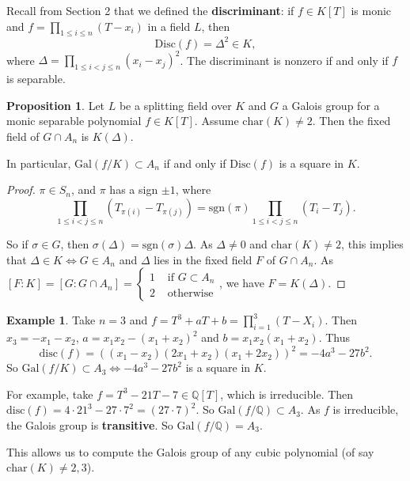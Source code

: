 \documentclass{article}
\theoremstyle{definition}
\newtheorem{prop}[theorem]{Proposition}
\newtheorem{example}{Example}[section]
\begin{document}
Recall from Section 2 that we defined the \textbf{discriminant}: if $f \in K[T]$ is monic and $f = \prod_{1\le i \le n}^{} (T-x_i)$ in a field $L$, then
\[
\text{Disc}(f) = \Delta^2 \in K,
\]
where $\Delta = \prod_{1\le i < j \le n}^{} (x_i-x_j)^2$. The discriminant is nonzero if and only if $f$ is separable.
\begin{prop}
    Let $L$ be a splitting field over $K$ and $G$ a Galois group for a monic separable polynomial $f \in K[T]$. Assume $\text{char}(K)\neq 2$. Then the fixed field of $G \cap A_n$ is $K(\Delta)$.
    \vspace{1mm}
    
    In particular, $\text{Gal}(f/K) \subset A_n$ if and only if $\text{Disc}(f)$ is a square in $K$.
\end{prop}

\begin{proof}
    
    $\pi \in S_n$, and $\pi$ has a sign $\pm 1$, where $$\prod_{1\le i<j\le n}^{} (T_{\pi(i)}-T_{\pi(j)})=\text{sgn}(\pi)\prod_{1\le i<j\le n}^{} (T_i-T_j).$$

    So if $\sigma \in G$, then $\sigma(\Delta) = \text{sgn}(\sigma)\Delta$. As $\Delta \neq 0$ and $\text{char}(K)\neq 2$, this implies that $\Delta \in K \iff G \in A_n$ and $\Delta$ lies in the fixed field $F$ of $G \cap A_n$. As $[F: K] = [G : G \cap A_n] = \begin{cases}
        1 &\text{ if } G \subset A_n \\
        2 &\text{ otherwise}
    \end{cases}$, we have $F = K(\Delta)$.
\end{proof}
\begin{example}
    Take $n=3$ and $f = T^3+aT+b = \prod_{i=1}^{3} (T-X_i)$. Then $x_3 = -x_1-x_2$, $a = x_1x_2 - (x_1+x_2)^2$ and $b=x_1x_2(x_1+x_2)$. Thus \[
    \text{disc}(f) = ((x_1-x_2)(2x_1+x_2)(x_1+2x_2))^2 = -4a^3 - 27b^2.
    \] 
    So $\text{Gal}(f/K) \subset A_3 \iff -4a^3-27b^2$ is a square in $K$.
    \vspace{1mm}
    
    For example, take $f = T^3-21T - 7 \in \mathbb{Q}[T]$, which is irreducible. Then $\text{disc}(f)=4 \cdot 21^3 - 27 \cdot  7 ^2 = (27\cdot 7)^2$. So $\text{Gal}(f/\mathbb{Q}) \subset A_3$. As $f$ is irreducible, the Galois group is \textbf{transitive}. So $\text{Gal}(f/\mathbb{Q}) = A_3$.
\end{example}
This allows us to compute the Galois group of any cubic polynomial (of say $\text{char}(K)\neq2,3$).
\end{document}
